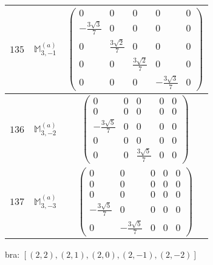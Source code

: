 \documentclass[fleqn,8pt,landscape]{jsarticle}
\begin{document}
\begin{center}
\begin{longtable}{ccc}
$ 135 $ & $ \mathbb{M}_{3,-1}^{(a)} $ & $ \begin{pmatrix} 0 & 0 & 0 & 0 & 0 \\ - \frac{3 \sqrt{3}}{7} & 0 & 0 & 0 & 0 \\ 0 & \frac{3 \sqrt{2}}{7} & 0 & 0 & 0 \\ 0 & 0 & \frac{3 \sqrt{2}}{7} & 0 & 0 \\ 0 & 0 & 0 & - \frac{3 \sqrt{3}}{7} & 0 \end{pmatrix} $ \\ \hline
$ 136 $ & $ \mathbb{M}_{3,-2}^{(a)} $ & $ \begin{pmatrix} 0 & 0 & 0 & 0 & 0 \\ 0 & 0 & 0 & 0 & 0 \\ - \frac{3 \sqrt{5}}{7} & 0 & 0 & 0 & 0 \\ 0 & 0 & 0 & 0 & 0 \\ 0 & 0 & \frac{3 \sqrt{5}}{7} & 0 & 0 \end{pmatrix} $ \\ \hline
$ 137 $ & $ \mathbb{M}_{3,-3}^{(a)} $ & $ \begin{pmatrix} 0 & 0 & 0 & 0 & 0 \\ 0 & 0 & 0 & 0 & 0 \\ 0 & 0 & 0 & 0 & 0 \\ - \frac{3 \sqrt{5}}{7} & 0 & 0 & 0 & 0 \\ 0 & - \frac{3 \sqrt{5}}{7} & 0 & 0 & 0 \end{pmatrix} $ \\
\end{longtable}
\end{center}
bra: $[(2,2),(2,1),(2,0),(2,-1),(2,-2)]$
\end{document}
